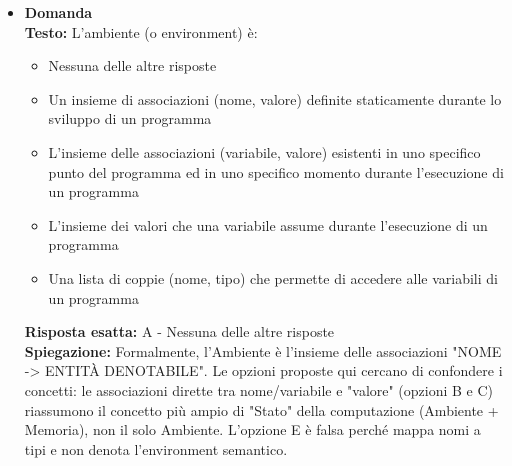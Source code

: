 \documentclass[12pt, a4paper]{article}
\newcounter{domandateoria}
\begin{document}
\begin{itemize}
    \item {}\textbf{Domanda \thedomandateoria} \\
    \textbf{Testo:} L'ambiente (o environment) è:
    \begin{itemize}
        \item[A)] Nessuna delle altre risposte
        \item[B)] Un insieme di associazioni (nome, valore) definite staticamente durante lo sviluppo di un programma
        \item[C)] L'insieme delle associazioni (variabile, valore) esistenti in uno specifico punto del programma ed in uno specifico momento durante l'esecuzione di un programma
        \item[D)] L'insieme dei valori che una variabile assume durante l'esecuzione di un programma
        \item[E)] Una lista di coppie (nome, tipo) che permette di accedere alle variabili di un programma
    \end{itemize}
    \textbf{Risposta esatta:} A - Nessuna delle altre risposte \\
    \textbf{Spiegazione:} Formalmente, l'Ambiente è l'insieme delle associazioni "NOME -> ENTITÀ DENOTABILE". Le opzioni proposte qui cercano di confondere i concetti: le associazioni dirette tra nome/variabile e "valore" (opzioni B e C) riassumono il concetto più ampio di "Stato" della computazione (Ambiente + Memoria), non il solo Ambiente. L'opzione E è falsa perché mappa nomi a tipi e non denota l'environment semantico.
    \vspace{0.3cm}

\newpage


\end{itemize}
\end{document}
